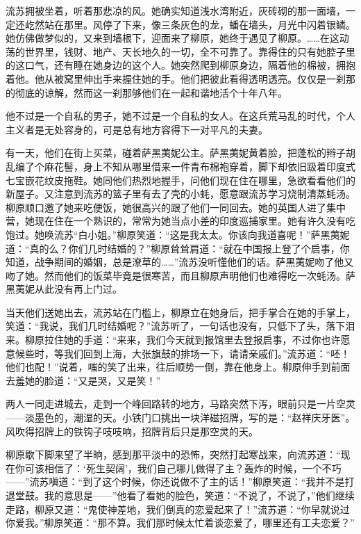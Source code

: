 \par 流苏拥被坐着，听着那悲凉的风。她确实知道浅水湾附近，灰砖砌的那一面墙，一定还屹然站在那里。风停了下来，像三条灰色的龙，蟠在墙头，月光中闪着银鳞。她仿佛做梦似的，又来到墙根下，迎面来了柳原，她终于遇见了柳原。……在这动荡的世界里，钱财、地产、天长地久的一切，全不可靠了。靠得住的只有她腔子里的这口气，还有睡在她身边的这个人。她突然爬到柳原身边，隔着他的棉被，拥抱着他。他从被窝里伸出手来握住她的手。他们把彼此看得透明透亮。仅仅是一刹那的彻底的谅解，然而这一刹那够他们在一起和谐地活个十年八年。
\par 他不过是一个自私的男子，她不过是一个自私的女人。在这兵荒马乱的时代，个人主义者是无处容身的，可是总有地方容得下一对平凡的夫妻。
\par 有一天，他们在街上买菜，碰着萨黑荑妮公主。萨黑荑妮黄着脸，把蓬松的辫子胡乱编了个麻花髻，身上不知从哪里借来一件青布棉袍穿着，脚下却依旧趿着印度式七宝嵌花纹皮拖鞋。她同他们热烈地握手，问他们现在住在哪里，急欲看看他们的新屋子。又注意到流苏的篮子里有去了壳的小蚝，愿意跟流苏学习烧制清蒸蚝汤。柳原顺口邀了她来吃便饭，她很高兴的跟了他们一同回去。她的英国人进了集中营，她现在住在一个熟识的，常常为她当点小差的印度巡捕家里。她有许久没有吃饱过。她唤流苏“白小姐。”柳原笑道：“这是我太太。你该向我道喜呢！”萨黑荑妮道：“真的么？你们几时结婚的？”柳原耸耸肩道：“就在中国报上登了个启事，你知道，战争期间的婚姻，总是潦草的……”流苏没听懂他们的话。萨黑荑妮吻了他又吻了她。然而他们的饭菜毕竟是很寒苦，而且柳原声明他们也难得吃一次蚝汤。萨黑荑妮从此没有再上门过。
\par 当天他们送她出去，流苏站在门槛上，柳原立在她身后，把手掌合在她的手掌上，笑道：“我说，我们几时结婚呢？”流苏听了，一句话也没有，只低下了头，落下泪来。柳原拉住她的手道：“来来，我们今天就到报馆里去登报启事，不过你也许愿意候些时，等我们回到上海，大张旗鼓的排场一下，请请亲戚们。”流苏道：“呸！他们也配！”说着，嗤的笑了出来，往后顺势一倒，靠在他身上。柳原伸手到前面去羞她的脸道：“又是哭，又是笑！”
\par 两人一同走进城去，走到一个峰回路转的地方，马路突然下泻，眼前只是一片空灵——淡墨色的，潮湿的天。小铁门口挑出一块洋磁招牌，写的是：“赵祥庆牙医”。风吹得招牌上的铁钩子吱吱响，招牌背后只是那空灵的天。
\par 柳原歇下脚来望了半晌，感到那平淡中的恐怖，突然打起寒战来，向流苏道：“现在你可该相信了：‘死生契阔’，我们自己哪儿做得了主？轰炸的时候，一个不巧——”流苏嗔道：“到了这个时候，你还说做不了主的话！”柳原笑道：“我并不是打退堂鼓。我的意思是——”他看了看她的脸色，笑道：“不说了，不说了，”他们继续走路，柳原又道：“鬼使神差地，我们倒真的恋爱起来了！”流苏道：“你早就说过你爱我。”柳原笑道：“那不算。我们那时候太忙着谈恋爱了，哪里还有工夫恋爱？”
